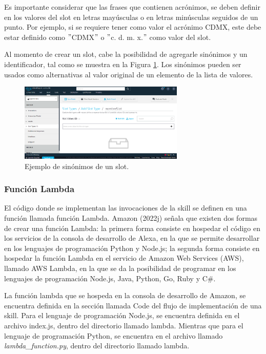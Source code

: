 Es importante considerar que las frases que contienen acrónimos, se deben definir en los valores del slot en letras mayúsculas o en letras minúsculas seguidos de un punto. Por ejemplo, si se requiere tener como valor el acrónimo CDMX, este debe estar definido como $"$CDMX$"$ o $"$c. d. m. x.$"$ como valor del slot.

Al momento de crear un slot, cabe la posibilidad de agregarle sinónimos y un identificador, tal como se muestra en la Figura \ref{fig:410}. Los sinónimos pueden ser usados como alternativas al valor original de un elemento de la lista de valores.

\begin{figure}[H]
  \centering
  \includegraphics[width=0.70\textwidth]{Cap4/Figuras/SlotTypesCreation.png}
  \caption{Ejemplo de sinónimos de un slot.}
  \label{fig:410}
\end{figure}


\subsubsection{Función Lambda}
\label{FuncionLambdacapIV}

El código donde se implementan las invocaciones de la skill se definen en una función llamada función Lambda. Amazon (2022j) señala que existen dos formas de crear una función Lambda: la primera forma consiste en hospedar el código en los servicios de la consola de desarrollo de Alexa, en la que se permite desarrollar en los lenguajes de programación Python y Node.js; la segunda forma consiste en hospedar la función Lambda en el servicio de Amazon Web Services (AWS), llamado AWS Lambda, en la que se da la posibilidad de programar en los lenguajes de programación Node.js, Java, Python, Go, Ruby y C\#.

La función lambda que se hospeda en la consola de desarrollo de Amazon, se encuentra definida en la sección llamada Code del flujo de implementación de una skill. Para el lenguaje de programación Node.js, se encuentra definida en el archivo index.js, dentro del directorio llamado lambda. Mientras que para el lenguaje de programación Python, se encuentra en el archivo llamado \textit{lambda\_function.py}, dentro del directorio llamado lambda.

